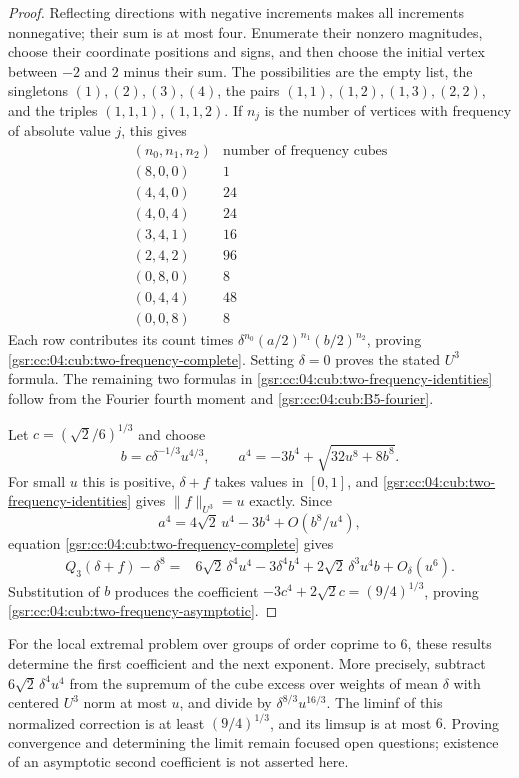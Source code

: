 \documentclass[11pt,letterpaper]{article}
\numberwithin{equation}{section}
\theoremstyle{definition}
\theoremstyle{remark}
\newcommand{\1}{\mathbf 1}
\begin{document}
\begin{proof}
Reflecting directions with negative increments makes all increments
nonnegative; their sum is at most four. Enumerate their nonzero magnitudes,
choose their coordinate positions and signs, and then choose the initial
vertex between $-2$ and $2$ minus their sum. The possibilities are the empty
list, the singletons $(1),(2),(3),(4)$, the pairs
$(1,1),(1,2),(1,3),(2,2)$, and the triples $(1,1,1),(1,1,2)$.
If $n_j$ is the number of vertices with frequency of absolute value $j$,
this gives
\[
 \begin{array}{c|r}
 (n_0,n_1,n_2)&\text{number of frequency cubes}\\\hline
 (8,0,0)&1\\
 (4,4,0)&24\\
 (4,0,4)&24\\
 (3,4,1)&16\\
 (2,4,2)&96\\
 (0,8,0)&8\\
 (0,4,4)&48\\
 (0,0,8)&8
 \end{array}
\]
Each row contributes its count times
$\delta^{n_0}(a/2)^{n_1}(b/2)^{n_2}$, proving
\eqref{gsr:cc:04:cub:two-frequency-complete}. Setting $\delta=0$ proves the stated
$U^3$ formula. The remaining two formulas in
\eqref{gsr:cc:04:cub:two-frequency-identities} follow from the Fourier fourth moment
and \eqref{gsr:cc:04:cub:B5-fourier}.

Let $c=(\sqrt2/6)^{1/3}$ and choose
\[
 b=c\delta^{-1/3}u^{4/3},\qquad
 a^4=-3b^4+\sqrt{32u^8+8b^8}.
\]
For small $u$ this is positive, $\delta+f$ takes values in $[0,1]$, and
\eqref{gsr:cc:04:cub:two-frequency-identities} gives $\|f\|_{U^3}=u$ exactly. Since
\[
 a^4=4\sqrt2\,u^4-3b^4+O(b^8/u^4),
\]
equation \eqref{gsr:cc:04:cub:two-frequency-complete} gives
\begin{align*}
 Q_3(\delta+f)-\delta^8
  ={}&6\sqrt2\,\delta^4u^4
      -3\delta^4b^4+2\sqrt2\,\delta^3u^4b+O_\delta(u^6).
\end{align*}
Substitution of $b$ produces the coefficient
$-3c^4+2\sqrt2c=(9/4)^{1/3}$, proving
\eqref{gsr:cc:04:cub:two-frequency-asymptotic}.
\end{proof}

For the local extremal problem over groups of order coprime to $6$, these
results determine the first coefficient and the next exponent. More
precisely, subtract $6\sqrt2\,\delta^4u^4$ from the supremum of the cube
excess over weights of mean $\delta$ with centered $U^3$ norm at most $u$,
and divide by $\delta^{8/3}u^{16/3}$. The liminf of this normalized correction
is at least $(9/4)^{1/3}$, and its limsup is at most $6$. Proving convergence
and determining the limit remain focused open questions; existence of an
asymptotic second coefficient is not asserted here.
\end{document}
